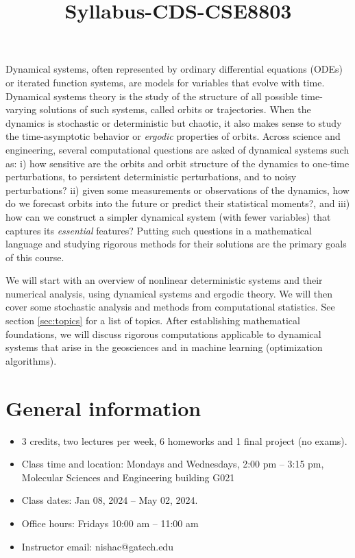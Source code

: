 \documentclass[12pt]{article}
\title{Syllabus-CDS-CSE8803}
\begin{document}
\MakeScribeTop

Dynamical systems, often represented by ordinary differential equations (ODEs) or iterated function systems, are models for variables that evolve with time. Dynamical systems theory is the study of the structure of all possible time-varying solutions of such systems, called orbits or trajectories. When the dynamics is stochastic or deterministic but chaotic, it also makes sense to study the time-asymptotic behavior or \emph{ergodic} properties of orbits. Across science and engineering, several computational questions are asked of dynamical systems such as: i) how sensitive are the orbits and orbit structure of the dynamics to one-time perturbations, to persistent deterministic perturbations, and to noisy perturbations?
ii) given some measurements or observations of the dynamics, how do we forecast orbits into the future or predict their statistical moments?, and iii) how can we construct a simpler dynamical system (with fewer variables) that captures its \emph{essential} features? Putting such questions in a mathematical language and studying rigorous methods for their solutions are the primary goals of this course.

We will start with an overview of nonlinear deterministic systems and their numerical analysis, using dynamical systems and ergodic theory. We will then cover some stochastic analysis and methods from computational statistics. See section \ref{sec:topics} for a list of topics. After establishing mathematical foundations, we will discuss rigorous computations applicable to dynamical systems that arise in the geosciences and in machine learning (optimization algorithms).

\section{General information}
\begin{itemize}
	\item 3 credits, two lectures per week, 6 homeworks and 1 final project (no exams).
	\item Class time and location: Mondays and Wednesdays, 2:00 pm -- 3:15 pm, Molecular Sciences and Engineering building G021
	\item Class dates: Jan 08, 2024 -- May 02, 2024.
	\item Office hours: Fridays 10:00 am -- 11:00 am
	\item Instructor email: nishac@gatech.edu
\end{itemize}
\end{document}
